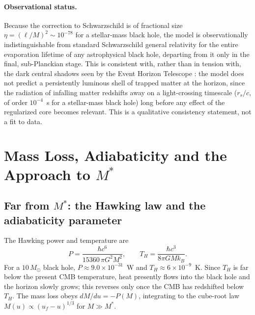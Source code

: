 \documentclass[11pt]{article}
\begin{document}
\paragraph{Observational status.} Because the correction to Schwarzschild is of fractional size $\eta=(\ell/M)^2\sim10^{-78}$ for a stellar-mass black hole, the model is observationally indistinguishable from standard Schwarzschild general relativity for the entire evaporation lifetime of any astrophysical black hole, departing from it only in the final, sub-Planckian stage. This is consistent with, rather than in tension with, the dark central shadows seen by the Event Horizon Telescope \citep{EHT2019}: the model does not predict a persistently luminous shell of trapped matter at the horizon, since the radiation of infalling matter redshifts away on a light-crossing timescale ($r_s/c$, of order $10^{-4}$~s for a stellar-mass black hole) long before any effect of the regularized core becomes relevant. This is a qualitative consistency statement, not a fit to data.

\section{Mass Loss, Adiabaticity and the Approach to \texorpdfstring{$M^*$}{M*}}
\label{sec:massloss}

\subsection{Far from \texorpdfstring{$M^*$}{M*}: the Hawking law and the adiabaticity parameter}
\label{sec:adiabatic}

The Hawking power and temperature are
\begin{equation}
P=\frac{\hbar c^6}{15360\,\pi G^2M^2},\qquad T_H=\frac{\hbar c^3}{8\pi GMk_B}.
\end{equation}
For a $10\,M_\odot$ black hole, $P\approx9.0\times10^{-31}$~W and $T_H\approx6\times10^{-9}$~K. Since $T_H$ is far below the present CMB temperature, heat presently flows into the black hole and the horizon slowly grows; this reverses only once the CMB has redshifted below $T_H$. The mass loss obeys $dM/du=-P(M)$, integrating to the cube-root law $M(u)\propto(u_f-u)^{1/3}$ for $M\gg M^*$.
\end{document}
